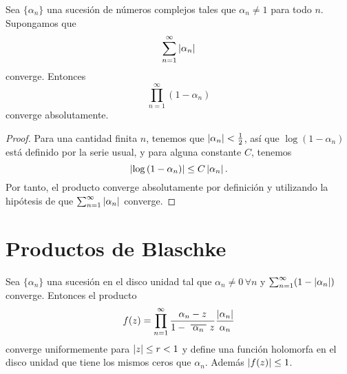 \begin{lemma}
    \label{convergencia}
    Sea $\{\alpha_n\}$ una sucesión de números complejos tales que $\alpha_n \not = 1$ para todo $n$. Supongamos que
    \begin{equation*}
        \sum_{n=1}^{\infty} \left\lvert\alpha_n\right\rvert
    \end{equation*}
    converge. Entonces
    \begin{equation*}
        \prod_{n=1}^{\infty} (1 - \alpha_n)
    \end{equation*}
    converge absolutamente.
\end{lemma}

\begin{proof}
    Para una cantidad finita $n$, tenemos que $\left\lvert\alpha_n\right\rvert < \frac{1}{2}$, así que $\log{(1 - \alpha_n)}$ está definido por la serie usual, y para alguna constante $C$, tenemos
    \begin{equation*}
        \left\lvert\log{(1 - \alpha_n)}\right\rvert \leq C \left\lvert\alpha_n\right\rvert.
    \end{equation*}
    Por tanto, el producto converge absolutamente por definición y utilizando la hipótesis de que $\sum_{n=1}^{\infty} \left\lvert\alpha_n\right\rvert$ converge.
\end{proof}

\section{Productos de Blaschke}

\begin{prop}
    Sea $\{\alpha_n\}$ una sucesión en el disco unidad tal que $\alpha_n \not = 0 \, \forall n$ y $\sum_{n=1}^{\infty} (1 - \left\lvert\alpha_n\right\rvert)$ converge. Entonces el producto
    \begin{equation*}
        f(z) = \prod_{n=1}^{\infty} \frac{\alpha_n - z}{1 - \xbar{\alpha_n}z} \dfrac{\abs{\alpha_n}}{\alpha_n}
    \end{equation*}
    converge uniformemente para $\left\lvert z\right\rvert \leq r < 1$ y define una función holomorfa en el disco unidad que tiene los mismos ceros que $\alpha_n$. Además $\left\lvert f(z)\right\rvert \leq 1$.
\end{prop}

